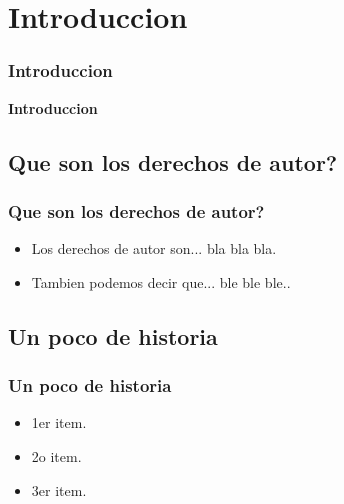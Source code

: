 \section{Introduccion}
\frame
{
	\frametitle{Introduccion}
	\begin{center}
	\bf \huge Introduccion
	\end{center}
}
\subsection{Que son los derechos de autor?}
\frame
{
	\frametitle{Que son los derechos de autor?}
	\begin{itemize}
	\item Los derechos de autor son... bla bla bla.
	\item Tambien podemos decir que... ble ble ble..
	\end{itemize}
}

\subsection{Un poco de historia}
\frame
{
  \frametitle{Un poco de historia}

  \begin{itemize}
  \item 1er item.
  \item 2o item.
  \item 3er item.      
  \end{itemize}
}

